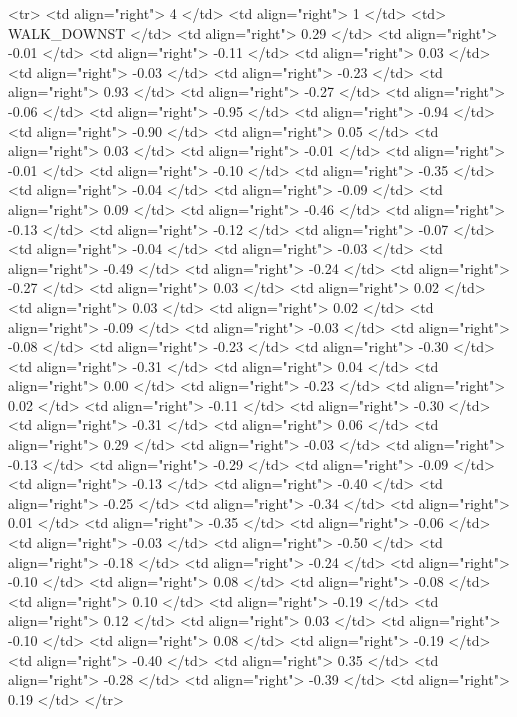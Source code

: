   <tr> <td align="right"> 4 </td> <td align="right">   1 </td> <td> WALK_DOWNST </td> <td align="right"> 0.29 </td> <td align="right"> -0.01 </td> <td align="right"> -0.11 </td> <td align="right"> 0.03 </td> <td align="right"> -0.03 </td> <td align="right"> -0.23 </td> <td align="right"> 0.93 </td> <td align="right"> -0.27 </td> <td align="right"> -0.06 </td> <td align="right"> -0.95 </td> <td align="right"> -0.94 </td> <td align="right"> -0.90 </td> <td align="right"> 0.05 </td> <td align="right"> 0.03 </td> <td align="right"> -0.01 </td> <td align="right"> -0.01 </td> <td align="right"> -0.10 </td> <td align="right"> -0.35 </td> <td align="right"> -0.04 </td> <td align="right"> -0.09 </td> <td align="right"> 0.09 </td> <td align="right"> -0.46 </td> <td align="right"> -0.13 </td> <td align="right"> -0.12 </td> <td align="right"> -0.07 </td> <td align="right"> -0.04 </td> <td align="right"> -0.03 </td> <td align="right"> -0.49 </td> <td align="right"> -0.24 </td> <td align="right"> -0.27 </td> <td align="right"> 0.03 </td> <td align="right"> 0.02 </td> <td align="right"> 0.03 </td> <td align="right"> 0.02 </td> <td align="right"> -0.09 </td> <td align="right"> -0.03 </td> <td align="right"> -0.08 </td> <td align="right"> -0.23 </td> <td align="right"> -0.30 </td> <td align="right"> -0.31 </td> <td align="right"> 0.04 </td> <td align="right"> 0.00 </td> <td align="right"> -0.23 </td> <td align="right"> 0.02 </td> <td align="right"> -0.11 </td> <td align="right"> -0.30 </td> <td align="right"> -0.31 </td> <td align="right"> 0.06 </td> <td align="right"> 0.29 </td> <td align="right"> -0.03 </td> <td align="right"> -0.13 </td> <td align="right"> -0.29 </td> <td align="right"> -0.09 </td> <td align="right"> -0.13 </td> <td align="right"> -0.40 </td> <td align="right"> -0.25 </td> <td align="right"> -0.34 </td> <td align="right"> 0.01 </td> <td align="right"> -0.35 </td> <td align="right"> -0.06 </td> <td align="right"> -0.03 </td> <td align="right"> -0.50 </td> <td align="right"> -0.18 </td> <td align="right"> -0.24 </td> <td align="right"> -0.10 </td> <td align="right"> 0.08 </td> <td align="right"> -0.08 </td> <td align="right"> 0.10 </td> <td align="right"> -0.19 </td> <td align="right"> 0.12 </td> <td align="right"> 0.03 </td> <td align="right"> -0.10 </td> <td align="right"> 0.08 </td> <td align="right"> -0.19 </td> <td align="right"> -0.40 </td> <td align="right"> 0.35 </td> <td align="right"> -0.28 </td> <td align="right"> -0.39 </td> <td align="right"> 0.19 </td> </tr>
